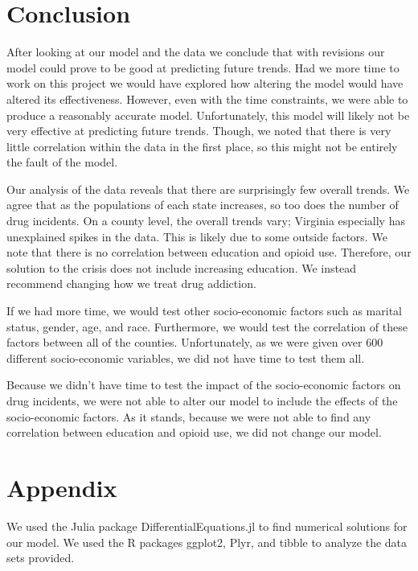 \documentclass[12pt, letterpaper]{article}
\begin{document}
\section{Conclusion}
After looking at our model and the data we conclude that with revisions our model could prove to be good at predicting future trends. Had we more time to work on this project we would have explored how altering the model would have altered its effectiveness. However, even with the time constraints, we were able to produce a reasonably accurate model. Unfortunately, this model will likely not be very effective at predicting future trends. Though, we noted that there is very little correlation within the data in the first place, so this might not be entirely the fault of the model.

Our analysis of the data reveals that there are surprisingly few overall trends. We agree that as the populations of each state increases, so too does the number of drug incidents. On a county level, the overall trends vary; Virginia especially has unexplained spikes in the data. This is likely due to some outside factors. We note that there is no correlation between education and opioid use. Therefore, our solution to the crisis does not include increasing education. We instead recommend changing how we treat drug addiction. 

If we had more time, we would test other socio-economic factors such as marital status, gender, age, and race. Furthermore, we would test the correlation of these factors between all of the counties. Unfortunately, as we were given over 600 different socio-economic variables, we did not have time to test them all. 

Because we didn't have time to test the impact of the socio-economic factors on drug incidents, we were not able to alter our model to include the effects of the socio-economic factors. As it stands, because we were not able to find any correlation between education and opioid use, we did not change our model. 

\newpage





\newpage

\section*{Appendix}
We used the Julia package DifferentialEquations.jl to find numerical solutions for our model. We used the R packages ggplot2, Plyr, and tibble to analyze the data sets provided. 
\end{document}

